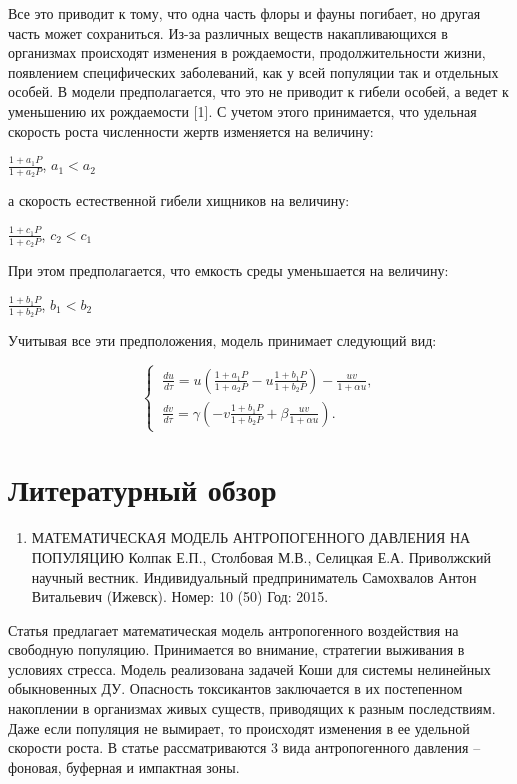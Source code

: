 \documentclass[
  13pt,
  fontsize=13pt,
  russian,
  a4paper,
,captions=tableheading
]{scrreprt}
\providecommand{\tightlist}{%
  \setlength{\itemsep}{0pt}\setlength{\parskip}{0pt}}
\begin{document}
Все это приводит к тому, что одна часть флоры и фауны погибает, но
другая часть может сохраниться. Из-за различных веществ накапливающихся
в организмах происходят изменения в рождаемости, продолжительности
жизни, появлением специфических заболеваний, как у всей популяции так и
отдельных особей. В модели предполагается, что это не приводит к гибели
особей, а ведет к уменьшению их рождаемости {[}1{]}. С учетом этого
принимается, что удельная скорость роста численности жертв изменяется на
величину:

\(\frac{1+a_1P}{1+a_2P}\), \(a_1<a_2\)

а скорость естественной гибели хищников на величину:

\(\frac{1+c_1P}{1+c_2P}\), \(c_2<c_1\)

При этом предполагается, что емкость среды уменьшается на величину:

\(\frac{1+b_1P}{1+b_2P}\), \(b_1<b_2\)

Учитывая все эти предположения, модель принимает следующий вид:

\[
\begin{cases}
\ \frac{du}{d\tau}=u(\frac{1+a_1P}{1+a_2P}-u\frac{1+b_1P}{1+b_2P})-\frac{uv}{1+\alpha u},\\
\ \frac{dv}{d\tau}=\gamma(-v\frac{1+b_1P}{1+b_2P}+\beta \frac{uv}{1+\alpha u}).
\end{cases}
\]

\hypertarget{ux43bux438ux442ux435ux440ux430ux442ux443ux440ux43dux44bux439-ux43eux431ux437ux43eux440}{%
\section{Литературный
обзор}\label{ux43bux438ux442ux435ux440ux430ux442ux443ux440ux43dux44bux439-ux43eux431ux437ux43eux440}}

\begin{enumerate}
\def\labelenumi{\arabic{enumi}.}
\tightlist
\item
  МАТЕМАТИЧЕСКАЯ МОДЕЛЬ АНТРОПОГЕННОГО ДАВЛЕНИЯ НА ПОПУЛЯЦИЮ Колпак
  Е.П., Столбовая М.В., Селицкая Е.А. Приволжский научный вестник.
  Индивидуальный предприниматель Самохвалов Антон Витальевич (Ижевск).
  Номер: 10 (50) Год: 2015.
\end{enumerate}

Статья предлагает математическая модель антропогенного воздействия на
свободную популяцию. Принимается во внимание, стратегии выживания в
условиях стресса. Модель реализована задачей Коши для системы нелинейных
обыкновенных ДУ. Опасность токсикантов заключается в их постепенном
накоплении в организмах живых существ, приводящих к разным последствиям.
Даже если популяция не вымирает, то происходят изменения в ее удельной
скорости роста. В статье рассматриваются 3 вида антропогенного давления
-- фоновая, буферная и импактная зоны.
\end{document}
